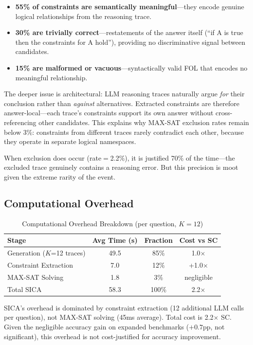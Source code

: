 \documentclass[11pt]{article}
\begin{document}
\begin{itemize}
    \item \textbf{55\% of constraints are semantically meaningful}---they encode genuine logical relationships from the reasoning trace.
    \item \textbf{30\% are trivially correct}---restatements of the answer itself (``if A is true then the constraints for A hold''), providing no discriminative signal between candidates.
    \item \textbf{15\% are malformed or vacuous}---syntactically valid FOL that encodes no meaningful relationship.
\end{itemize}

The deeper issue is architectural: LLM reasoning traces naturally argue \emph{for} their conclusion rather than \emph{against} alternatives. Extracted constraints are therefore answer-local---each trace's constraints support its own answer without cross-referencing other candidates. This explains why MAX-SAT exclusion rates remain below 3\%: constraints from different traces rarely contradict each other, because they operate in separate logical namespaces.

When exclusion does occur (rate$=$2.2\%), it is justified 70\% of the time---the excluded trace genuinely contains a reasoning error. But this precision is moot given the extreme rarity of the event.

\subsection{Computational Overhead}

\begin{table}[h]
\centering
\caption{Computational Overhead Breakdown (per question, $K=12$)}
\label{tab:overhead}
\begin{tabular}{lccc}
\toprule
Stage & Avg Time (s) & Fraction & Cost vs SC \\
\midrule
Generation ($K$=12 traces) & 49.5 & 85\% & 1.0$\times$ \\
Constraint Extraction & 7.0 & 12\% & +1.0$\times$ \\
MAX-SAT Solving & 1.8 & 3\% & negligible \\
\midrule
Total SICA & 58.3 & 100\% & 2.2$\times$ \\
\bottomrule
\end{tabular}
\end{table}

SICA's overhead is dominated by constraint extraction (12 additional LLM calls per question), not MAX-SAT solving (45ms average). Total cost is 2.2$\times$ SC. Given the negligible accuracy gain on expanded benchmarks ($+0.7$pp, not significant), this overhead is not cost-justified for accuracy improvement.
\end{document}
